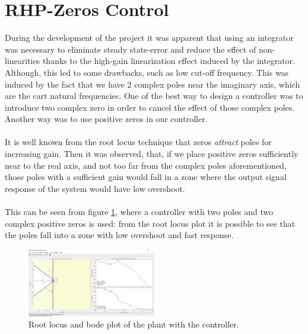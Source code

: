 \section{RHP-Zeros Control}
During the development of the project it was apparent that using an integrator was necessary to eliminate steady state-error and reduce the effect of non-linearities thanks to the high-gain linearization effect induced by the integrator. Although, this led to some drawbacks, such as low cut-off frequency. This was induced by the fact that we have 2 complex poles near the imaginary axis, which are the cart natural frequencies. One of the best way to design a controller was to introduce two complex zero in order to cancel the effect of those complex poles. Another way was to use positive zeros in our controller.\\ \\
It is well known from the root locus technique that zeros \emph{attract} poles for increasing gain. Then it was observed, that, if we place positive zeros sufficiently near to the real axis, and not too far from the complex poles  aforementioned, those poles with a sufficient gain would fall in a zone where the output signal response of the system would have low overshoot. \\ \\ This can be seen from figure \ref{fig:rlocusrhp}, where a controller with two poles and two complex positive zeros is used: from the root locus plot it is possible to see that the poles fall into a zone with low overshoot and fast response.

\begin{figure}[h]
\centering
\includegraphics[width=0.5\textwidth]{img/pos_zeros_design.png}
\caption{Root locus and bode plot of the plant with the controller.}
\label{fig:rlocusrhp}
\end{figure}

